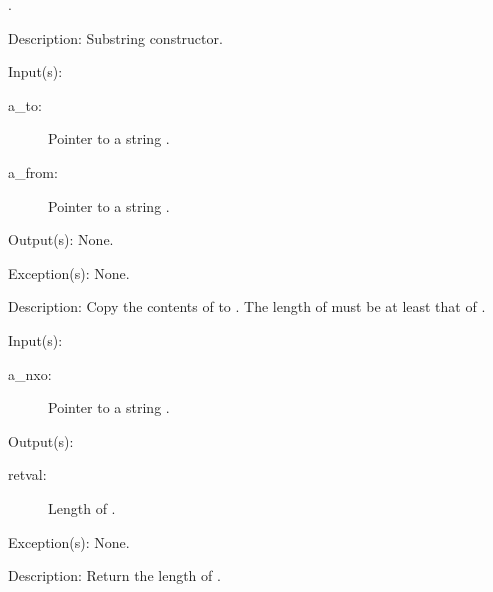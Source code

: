 \begin{capi}
\begin{capilist}
		\begin{description}\item[]
		\item[.]
		\end{description}
	\item[Description: ]
		Substring constructor.
	\end{capilist}
\label{nxo_string_copy}
	\begin{capilist}
	\item[Input(s): ]
		\begin{description}\item[]
		\item[a\_to: ]
			Pointer to a string .
		\item[a\_from: ]
			Pointer to a string .
		\end{description}
	\item[Output(s): ] None.
	\item[Exception(s): ] None.
	\item[Description: ]
		Copy the contents of  to .  The length
		of  must be at least that of .
	\end{capilist}
\label{nxo_string_len_get}
	\begin{capilist}
	\item[Input(s): ]
		\begin{description}\item[]
		\item[a\_nxo: ]
			Pointer to a string \classname{nxo}.
		\end{description}
	\item[Output(s): ]
		\begin{description}\item[]
		\item[retval: ]
			Length of \cvar{a\_nxo}.
		\end{description}
	\item[Exception(s): ] None.
	\item[Description: ]
		Return the length of \cvar{a\_nxo}.
	\end{capilist}
\label{nxo_string_el_get}
\end{capi}
